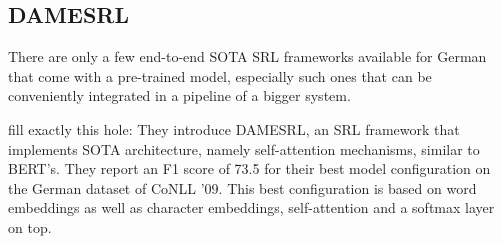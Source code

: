 

\subsection{DAMESRL}

There are only a few end-to-end SOTA SRL frameworks available for German that come with a pre-trained model,
especially such ones that can be conveniently integrated in a pipeline of a bigger system.

\cite{do2018flexible} fill exactly this hole: They introduce DAMESRL, an SRL framework
that implements SOTA architecture, namely self-attention mechanisms, similar to BERT's.
They report an F1 score of 73.5 for their best model configuration on the German dataset
of CoNLL '09. This best configuration is based on word embeddings as well as character
embeddings, self-attention and a softmax layer on top.

